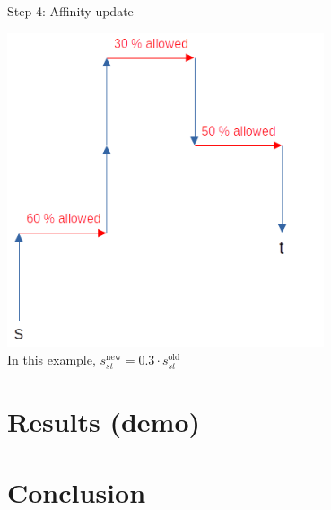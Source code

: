 \documentclass[10pt]{beamer}
\begin{document}
	
	\begin{frame}{Step 4: Affinity update}
		\begin{center}
			\includegraphics[width=0.7\textwidth]{img/allowed_flow.png} \\
			In this example, $s^\text{new}_{st} = 0.3 \cdot s^\text{old}_{st}$
		\end{center}
	\end{frame}
	

	
	\section{Results (demo)} 
	
	
	
	\section{Conclusion} 
	
	
\end{document}
